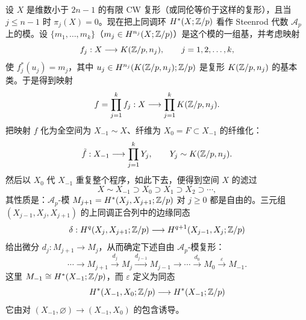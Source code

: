 设 $X$ 是维数小于 $2n-1$ 的有限 CW 复形（或同伦等价于这样的复形），且当 $j\le n-1$ 时 $\pi_j(X)=0$。现在把上同调环 $H^*(X;\mathbb{Z}/p)$ 看作 Steenrod 代数 $\mathcal{A}_p$ 上的模。设 $\{m_1,\dots,m_k\}$（$m_j\in H^{n_j}(X;\mathbb{Z}/p)$）是这个模的一组基，并考虑映射
\[
f_j:X\longrightarrow K(\mathbb{Z}/p,n_j),\qquad j=1,2,\dots,k,
\]
使 $f_j^*(u_j)=m_j$，其中 $u_j\in H^{n_j}(K(\mathbb{Z}/p,n_j);\mathbb{Z}/p)$ 是复形 $K(\mathbb{Z}/p,n_j)$ 的基本类。于是得到映射
\[
f=\prod_{j=1}^{k}f_j:X\longrightarrow\prod_{j=1}^{k}K(\mathbb{Z}/p,n_j).
\]
把映射 $f$ 化为全空间为 $X_{-1}\sim X$、纤维为 $X_0=F\subset X_{-1}$ 的纤维化：
\[
\tilde f:X_{-1}\longrightarrow\prod_{j=1}^{k}Y_j,\qquad Y_j\sim K(\mathbb{Z}/p,n_j).
\]
然后以 $X_0$ 代 $X_{-1}$ 重复整个程序，如此下去，便得到空间 $X$ 的滤过
\begin{equation}
X\sim X_{-1}\supset X_0\supset X_1\supset X_2\supset\cdots, \tag{7.12}
\end{equation}
其性质是：$\mathcal{A}_p$-模 $M_{j+1}=H^*(X_j,X_{j+1};\mathbb{Z}/p)$ 对 $j\ge0$ 都是自由的。三元组 $(X_{j-1},X_j,X_{j+1})$ 的上同调正合列中的边缘同态
\[
\delta:H^q(X_j,X_{j+1};\mathbb{Z}/p)\longrightarrow H^{q+1}(X_{j-1},X_j;\mathbb{Z}/p)
\]
给出微分 $d_j:M_{j+1}\to M_j$，从而确定下述自由 $\mathcal{A}_p$-模复形：
\begin{equation}
\cdots\longrightarrow M_{j+1}\xrightarrow{d_j}M_j\xrightarrow{d_{j-1}}M_{j-1}\longrightarrow\cdots\xrightarrow{d_0}M_0\xrightarrow{\varepsilon}M_{-1}. \tag{7.13}
\end{equation}
这里 $M_{-1}\cong H^*(X_{-1};\mathbb{Z}/p)$，而 $\varepsilon$ 定义为同态
\[
H^*(X_{-1},X_0;\mathbb{Z}/p)\longrightarrow H^*(X_{-1};\mathbb{Z}/p)
\]
它由对 $(X_{-1},\varnothing)\to(X_{-1},X_0)$ 的包含诱导。

